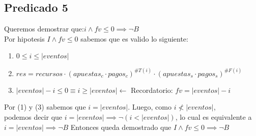 \documentclass[../document.tex]{subfiles}
\begin{document}
\subsection*{Predicado 5}
\noindent Queremos demostrar que:\hspace{3em}$i\land fv\leq 0 \implies \lnot B$
\\Por hipotesis $I\land fv\leq 0$ sabemos que es valido lo siguiente:
\begin{enumerate}
    \item $0\leq i \leq |eventos|$
    \item $res=recursos\cdot(apuestas_c\cdot pagos_c)^{\#T(i)}\cdot(apuestas_s\cdot pagos_s)^{\#F(i)}$
    \item $|eventos|-i\leq 0 \equiv i \geq |eventos|$\hfill{\color{BlueViolet}$\longleftarrow$ Recordatorio: $fv=|eventos|-i$}
\end{enumerate}
\salto{\baselineskip}
Por (1) y (3) sabemos que $i=|eventos|$. Luego, como $i\not<|eventos|$, 
\\podemos decir que $i=|eventos|\implies \lnot(i<|eventos|)$, lo cual es equivalente a
$i=|eventos|\implies \lnot B$
\salto{\baselineskip}
Entonces queda demostrado que $I\land fv\leq 0 \implies \lnot B$
\end{document}

